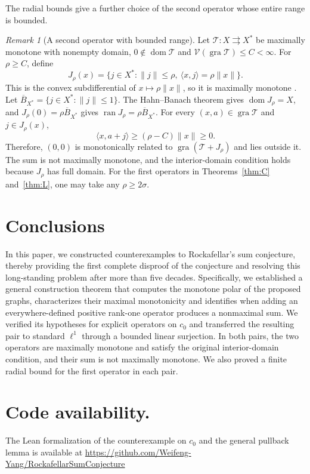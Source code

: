 \documentclass[11pt]{article}
\newcommand{\gra}{\operatorname{gra}}
\newcommand{\dom}{\operatorname{dom}}
\newcommand{\pair}[2]{\langle #1,#2\rangle}
\theoremstyle{definition}
\theoremstyle{remark}
\newtheorem{remark}{Remark}
\begin{document}
The radial bounds give a further choice of the second operator whose entire range is bounded.

\begin{remark}[A second operator with bounded range]
\label{rem:bounded-range-partner}
Let $\mathcal T:X\rightrightarrows X^*$ be maximally monotone with nonempty domain, $0\notin\dom\mathcal T$ and $\mathcal V(\gra\mathcal T)\le C<\infty$. For $\rho\ge C$, define
\[
J_\rho(x)=
\{j\in X^*:\|j\|\le\rho,\ \pair{x}{j}=\rho\|x\|\}.
\]
This is the convex subdifferential of $x\mapsto\rho\|x\|$, so it is maximally monotone \cite{rockafellar1970subdiff}. Let $\overline B_{X^*}=\{j\in X^*:\|j\|\le1\}$. The Hahn--Banach theorem gives $\dom J_\rho=X$, and $J_\rho(0)=\rho\overline B_{X^*}$ gives $\operatorname{ran}J_\rho=\rho\overline B_{X^*}$. For every $(x,a)\in\gra\mathcal T$ and $j\in J_\rho(x)$,
\[
\pair{x}{a+j}\ge(\rho-C)\|x\|\ge0.
\]
Therefore, $(0,0)$ is monotonically related to $\gra(\mathcal T+J_\rho)$ and lies outside it. The sum is not maximally monotone, and the interior-domain condition holds because $J_\rho$ has full domain. For the first operators in Theorems~\ref{thm:C} and~\ref{thm:L}, one may take any $\rho\ge2\sigma$.
\end{remark}



\section{Conclusions}
\label{sec:conclusion}

In this paper, we constructed counterexamples to Rockafellar's sum conjecture, thereby providing the first complete disproof of the conjecture and resolving this long-standing problem after more than five decades. Specifically, we established a general construction theorem that computes the monotone polar of the proposed graphs, characterizes their maximal monotonicity and identifies when adding an everywhere-defined positive rank-one operator produces a nonmaximal sum. We verified its hypotheses for explicit operators on $c_0$ and transferred the resulting pair to standard $\ell^1$ through a bounded linear surjection. In both pairs, the two operators are maximally monotone and satisfy the original interior-domain condition, and their sum is not maximally monotone. We also proved a finite radial bound for the first operator in each pair.

\section*{Code availability.}
The Lean formalization of the counterexample on $c_0$ and the general pullback lemma is available at \url{https://github.com/Weifeng-Yang/RockafellarSumConjecture}
\end{document}
